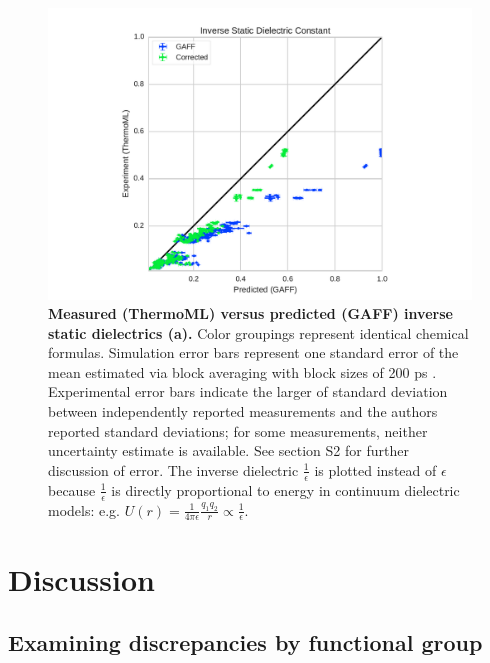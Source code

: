 \documentclass[aps,pre,twocolumn,nofootinbib,superscriptaddress,linenumbers]{revtex4-1}
\begin{document}
\begin{figure}
\includegraphics[width=\columnwidth]{./figures/dielectrics_thermoml.pdf}

\caption{{\bf Measured (ThermoML) versus predicted (GAFF) inverse static dielectrics (a).}
Color groupings represent identical chemical formulas.  Simulation error bars represent one standard error of the mean estimated via block averaging with block sizes of 200 ps \cite{flyvbjerg1989error}.  
Experimental error bars indicate the larger of standard deviation between independently reported measurements and the authors reported standard deviations; for some measurements, neither uncertainty estimate is available.  
See section S2 for further discussion of error.  
The inverse dielectric $\frac{1}{\epsilon}$ is plotted instead of $\epsilon$ because $\frac{1}{\epsilon}$ is directly proportional to energy in continuum dielectric models: e.g. $U(r) = \frac{1}{4 \pi \epsilon} \frac{q_1 q_2}{r} \propto \frac{1}{\epsilon}$.
}
\label{figure:Dielectric}
\end{figure}


\section{Discussion}

\subsection{Examining discrepancies by functional group}
\end{document}
